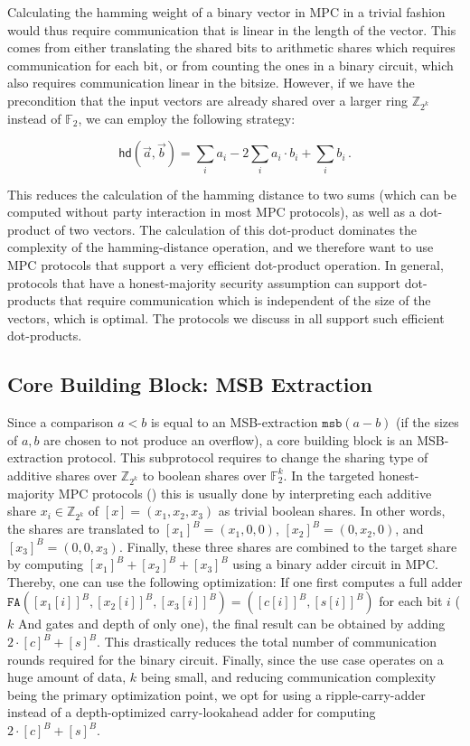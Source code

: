 \documentclass[a4paper,11pt,
]{article}
\newcommand{\F}{\ensuremath{\mathbb{F}}\xspace}
\newcommand{\Z}{\ensuremath{\mathbb{Z}}\xspace}
\newcommand{\shared}[1]{\ensuremath{[{#1}]}}
\newcommand{\sharedB}[1]{\ensuremath{[{#1}]^B}}
\begin{document}
Calculating the hamming weight of a binary vector in MPC in a trivial fashion would thus require communication that is linear in the length of the vector. This comes from either translating the shared bits to arithmetic shares which requires communication for each bit, or from counting the ones in a binary circuit, which also requires communication linear in the bitsize. However, if we have the precondition that the input vectors are already shared over a larger ring $\Z_{2^k}$ instead of $\F_2$, we can employ the following strategy:

\[
    \mathsf{hd}(\vec{a}, \vec{b}) = \sum_i a_i - 2\sum_i a_i \cdot b_i + \sum_i b_i\,.
\]

This reduces the calculation of the hamming distance to two sums (which can be computed without party interaction in most MPC protocols), as well as a dot-product of two vectors.
The calculation of this dot-product dominates the complexity of the hamming-distance operation, and we therefore want to use MPC protocols that support a very efficient dot-product operation.
In general, protocols that have a honest-majority security assumption can support dot-products that require communication which is independent of the size of the vectors, which is optimal.
The protocols we discuss in  all support such efficient dot-products.

\subsection{Core Building Block: MSB Extraction} \label{sec::a2b}

Since a comparison $a < b$ is equal to an MSB-extraction $\texttt{msb}(a-b)$ (if the sizes of $a,b$ are chosen to not produce an overflow), a core building block is an MSB-extraction protocol. This subprotocol requires to change the sharing type of additive shares over $\Z_{2^k}$ to boolean shares over $\F_2^k$. In the targeted honest-majority MPC protocols () this is usually done by interpreting each additive share $x_i \in \Z_{2^k}$ of $\shared{x}=(x_1, x_2, x_3)$ as trivial boolean shares. In other words, the shares are translated to $\sharedB{x_1} = (x_1, 0, 0)$, $\sharedB{x_2} = (0, x_2, 0)$, and $\sharedB{x_3} = (0, 0, x_3)$. Finally, these three shares are  combined to the target share by computing $\sharedB{x_1} + \sharedB{x_2} + \sharedB{x_3}$ using a binary adder circuit in MPC. Thereby, one can use the following optimization: If one first computes a full adder $\texttt{FA}(\sharedB{x_1[i]}, \sharedB{x_2[i]}, \sharedB{x_3[i]}) = (\sharedB{c[i]}, \sharedB{s[i]})$ for each bit $i$ ($k$ And gates and depth of only one), the final result can be obtained by adding $2 \cdot \sharedB{c} + \sharedB{s}$. This drastically reduces the total number of communication rounds required for the binary circuit.
Finally, since the use case operates on a huge amount of data, $k$ being small, and reducing communication complexity being the primary optimization point, we opt for using a ripple-carry-adder instead of a depth-optimized carry-lookahead adder for computing $2 \cdot \sharedB{c} + \sharedB{s}$.
\end{document}
